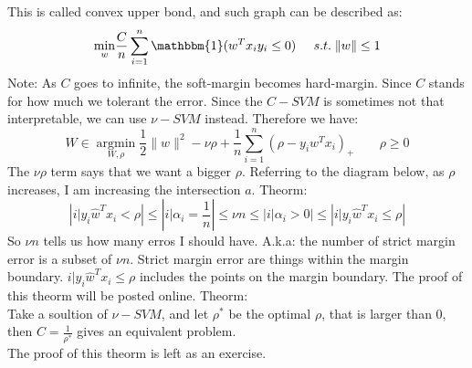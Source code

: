 \documentclass[twoside]{article}
\theoremstyle{definition}
\theoremstyle{definition}
\theoremstyle{remark}
\begin{document}
This is called convex upper bond, and such graph can be described as:
\[ \underset{w}{\operatorname{min}} \frac{C}{n} \sum_{i=1}^n \mathbbm{1} (w^T x_i y_i \leq 0) \;\;\;\;\; s.t. \; \|w\| \leq 1\]
Note: As $C$ goes to infinite, the soft-margin becomes hard-margin. Since $C$ stands for how much we tolerant the error. Since the $C-SVM$ is sometimes not that interpretable, we can use $\nu - SVM$ instead. Therefore we have:
\[\hat W \in \underset{W,\rho}{\operatorname{argmin}} \frac{1}{2} \|w\|^2 - \nu \rho + \frac{1}{n}\sum_{i=1}^n ( \rho - y_i w^T x_i )_+ \;\;\;\;\;\;\; \rho \geq 0\]
The $\nu\rho$ term says that we want a bigger $\rho$.
Referring to the diagram below, as $\rho$ increases, I am increasing the intersection $a$.
Theorm:
\[|{i|y_i \hat w^T x_i < \rho}| \leq | { i| \alpha_i = \frac{1}{n}}| \leq \nu n \leq |{i| \alpha_i > 0}| \leq | { i| y_i \hat w^T x_i \leq \rho}|\]
So $\nu n$ tells us how many erros I should have. A.k.a: the number of strict margin error is a subset of $\nu n$. Strict margin error are things within the margin boundary. ${i| y_i \hat w^T x_i \leq \rho}$ includes the points on the margin boundary. The proof of this theorm will be posted online.  
Theorm:\\
Take a soultion of $ \nu - SVM$, and let $\rho^*$ be the optimal $\rho$, that is larger than 0, then $C = \frac{1}{\rho^*}$ gives an equivalent problem. \\
The proof of this theorm is left as an exercise. 
\end{document}
